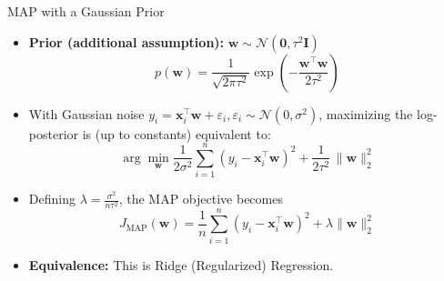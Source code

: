 \documentclass[serif, aspectratio=169]{beamer}
\begin{document}
\begin{frame}{MAP with a Gaussian Prior}
    \begin{itemize}
        \item \textbf{Prior (additional assumption):} \(\mathbf{w}\sim \mathcal{N}(\mathbf{0},\tau^2\mathbf{I})\)
        \[
            p(\mathbf{w})=\frac{1}{\sqrt{2\pi\tau^2}}
            \exp\!\left(-\frac{\mathbf{w}^\top \mathbf{w}}{2\tau^2}\right)
        \]
        \item With Gaussian noise \(y_i = \mathbf{x}_i^\top \mathbf{w} + \varepsilon_i, \varepsilon_i\sim\mathcal{N}(0,\sigma^2)\),
        maximizing the log-posterior is (up to constants) equivalent to:
        \[
            \arg\min_{\mathbf{w}}
            \frac{1}{2\sigma^2}\sum_{i=1}^n (y_i-\mathbf{x}_i^\top\mathbf{w})^2
            + \frac{1}{2\tau^2}\,\|\mathbf{w}\|_2^2
        \]
        \item Defining \(\displaystyle \lambda=\frac{\sigma^2}{n\tau^2}\), the MAP objective becomes
        \[
            J_{\text{MAP}}(\mathbf{w})
            = \frac{1}{n}\sum_{i=1}^n (y_i-\mathbf{x}_i^\top\mathbf{w})^2 + \lambda \|\mathbf{w}\|_2^2
        \]
        \item \textbf{Equivalence:} This is Ridge (Regularized) Regression.
    \end{itemize}
\end{frame}



\end{document}
